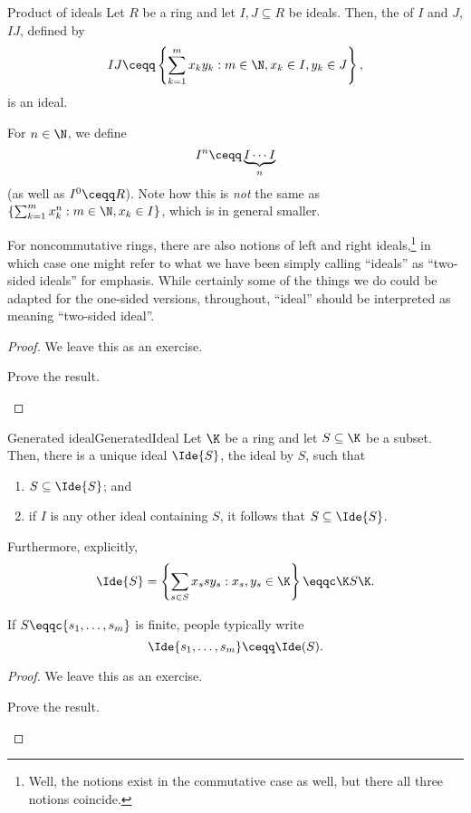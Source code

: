 \begin{prp}{Product of ideals}{}
	Let $R$ be a ring and let $I,J\subseteq R$ be ideals.  Then, the  of $I$ and $J$, $IJ$, defined by
	\begin{equation}
	IJ\ceqq \left\{ \sum _{k=1}^mx_ky_k:m\in \N ,x_k\in I,y_k\in J\right\} ,
	\end{equation}
	is an ideal.
	\begin{rmk}
		For $n\in \N$, we define
		\begin{equation}
		I^n\ceqq \underbrace{I\cdots I}_n
		\end{equation}
		(as well as $I^0\ceqq R$).  Note how this is \emph{not} the same as $\left\{ \sum _{k=1}^mx_k^n:m\in \N ,x_k\in I\right\}$, which is in general smaller.
	\end{rmk}
	\begin{rmk}
		For noncommutative rings, there are also notions of left and right ideals,\footnote{Well, the notions exist in the commutative case as well, but there all three notions coincide.} in which case one might refer to what we have been simply calling ``ideals'' as ``two-sided ideals'' for emphasis.  While certainly some of the things we do could be adapted for the one-sided versions, throughout, ``ideal'' should be interpreted as meaning ``two-sided ideal''.
	\end{rmk}
	\begin{proof}
		We leave this as an exercise.
		\begin{exr}[breakable=false]{}{}
			Prove the result.
		\end{exr}
	\end{proof}
\end{prp}
\begin{prp}{Generated ideal}{GeneratedIdeal}
	Let $\K$ be a ring and let $S\subseteq \K$ be a subset.  Then, there is a unique ideal $\Ide{S}$, the ideal  by $S$, such that
	\begin{enumerate}
		\item $S\subseteq \Ide{S}$; and
		\item if $I$ is any other ideal containing $S$, it follows that $S\subseteq \Ide{S}$.
	\end{enumerate}
	Furthermore, explicitly,
	\begin{equation}
	\Ide{S}=\left\{ \sum _{s\in S}x_ssy_s:x_s,y_s\in \K \right\} \eqqc \K S\K .
	\end{equation}
	\begin{rmk}
		If $S\eqqc \{ s_1,\ldots ,s_m\}$ is finite, people typically write
		\begin{equation}
		\Ide{s_1,\ldots ,s_m}\ceqq \Ide (S).
		\end{equation}
	\end{rmk}
	\begin{proof}
		We leave this as an exercise.
		\begin{exr}[breakable=false]{}{}
			Prove the result.
		\end{exr}
	\end{proof}
\end{prp}

